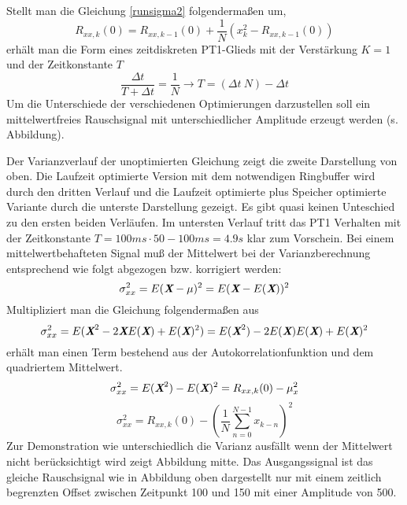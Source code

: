 \documentclass[
    10pt, %
    DIV12,
    english, %
    a5paper, %
    twoside, %
    titlepage, %
    parskip=half, %
    headings=small, %
    listof=totoc, %
    bibliography=totoc, %
    index=totoc, %
    captions=tableheading, %
    final %
]{scrbook}
\begin{document}
Stellt man die Gleichung \eqref{runsigma2} folgendermaßen um,
\begin{equation}\label{runsigma2}
R_{xx,k}(0)=R_{xx,k-1}(0)+\frac{1}{N}\left(x_{k}^2-R_{xx,k-1}(0)\right)
\end{equation}
erhält man die Form eines zeitdiskreten PT1-Glieds mit der Verstärkung $K=1$ und der Zeitkonstante $T$
\begin{equation}
\frac{\Delta t}{T+\Delta t}=\frac{1}{N} \rightarrow T=(\Delta t\:N)-\Delta t \nonumber
\end{equation}
Um die Unterschiede der verschiedenen Optimierungen darzustellen soll ein mittelwertfreies Rauschsignal mit unterschiedlicher Amplitude erzeugt werden (s. Abbildung).

Der Varianzverlauf der unoptimierten Gleichung zeigt die zweite Darstellung von oben. Die Laufzeit optimierte Version mit dem notwendigen Ringbuffer wird durch den dritten Verlauf und die Laufzeit optimierte plus Speicher optimierte Variante durch die unterste Darstellung gezeigt. Es gibt quasi keinen Unteschied zu den ersten beiden Verläufen. Im untersten Verlauf tritt das PT1 Verhalten mit der Zeitkonstante $T=100ms\cdot50-100ms=4.9s$ klar zum Vorschein.\newline
\newline
Bei einem mittelwertbehafteten Signal muß der Mittelwert bei der Varianzberechnung entsprechend wie folgt abgezogen bzw. korrigiert werden:
\begin{equation}
\sigma_{xx}^2=E(\textit{\textbf{X}}-\mu)^2=E(\textit{\textbf{X}}-E({\textit{\textbf{X}}}))^2 \nonumber
\end{equation}
Multipliziert man die Gleichung folgendermaßen aus 
\begin{equation}
\sigma_{xx}^2=E(\textit{\textbf{X}}^2-2\textit{\textbf{X}}E({\textit{\textbf{X}}})+E(\textit{\textbf{X}})^2) \nonumber
=E(\textit{\textbf{X}}^2)-2E(\textit{\textbf{X}})E({\textit{\textbf{X}}})+E(\textit{\textbf{X}})^2 \nonumber
\end{equation}
erhält man einen Term bestehend aus der Autokorrelationfunktion und dem quadriertem Mittelwert.
\begin{equation}
\sigma_{xx}^2=E(\textit{\textbf{X}}^2)-E(\textit{\textbf{X}})^2=R_{xx,k}(0)-\mu_{x}^2\nonumber
\end{equation}
\begin{equation}\label{initsigmamittelwert}
\sigma_{xx}^2=R_{xx,k}(0)-\left(\frac{1}{N}\sum_{n=0}^{N-1}x_{k-n}\right)^2
\end{equation}
Zur Demonstration wie unterschiedlich die Varianz ausfällt wenn der Mittelwert nicht berücksichtigt wird zeigt Abbildung mitte. Das Ausgangssignal ist das gleiche Rauschsignal wie in Abbildung oben dargestellt nur mit einem zeitlich begrenzten Offset zwischen Zeitpunkt 100 und 150 mit einer Amplitude von 500.
\end{document}
